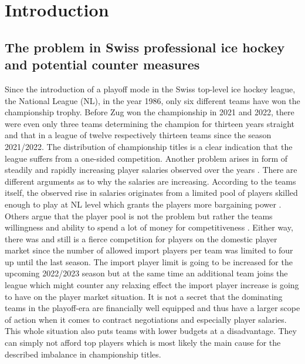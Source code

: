 \documentclass[12pt,a4paper]{article}\usepackage[]{graphicx}\usepackage[]{xcolor}
\begin{document}


\setcounter{page}{2}  %
\newpage

\tableofcontents  %
\newpage

\listoffigures
\listoftables
\newpage

\section{Introduction}

\setlength{\parskip}{\baselineskip}  %

\subsection{The problem in Swiss professional ice hockey and potential counter measures}

Since the introduction of a playoff mode in the Swiss top-level ice hockey league, the National League (NL), in the year 1986, only six different teams have won the championship trophy. Before Zug won the championship in 2021 and 2022, there were even only three teams determining the champion for thirteen years straight and that in a league of twelve respectively thirteen teams since the season 2021/2022. The distribution of championship titles is a clear indication that the league suffers from a one-sided competition. Another problem arises in form of steadily and rapidly increasing player salaries observed over the years \citep[see][]{germann_spielerlohne_2020,roth_zsc-boss_2018}. There are different arguments as to why the salaries are increasing. According to the teams itself, the observed rise in salaries originates from a limited pool of players skilled enough to play at NL level which grants the players more bargaining power \citep{noauthor_zu_2018}. Others argue that the player pool is not the problem but rather the teams willingness and ability to spend a lot of money for competitiveness \citep[see][]{roth_wegen_2020}. Either way, there was and still is a fierce competition for players on the domestic player market since the number of allowed import players per team was limited to four up until the last season. The import player limit is going to be increased for the upcoming 2022/2023 season but at the same time an additional team joins the league which might counter any relaxing effect the import player increase is going to have on the player market situation. It is not a secret that the dominating teams in the playoff-era are financially well equipped and thus have a larger scope of action when it comes to contract negotiations and especially player salaries. This whole situation also puts teams with lower budgets at a disadvantage. They can simply not afford top players which is most likely the main cause for the described imbalance in championship titles. 
\end{document}
